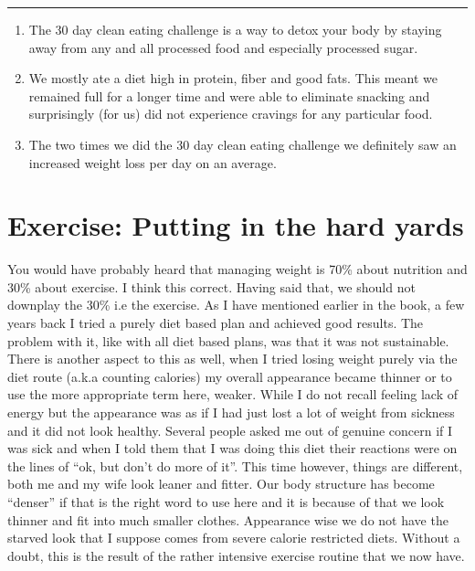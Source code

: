 \documentclass[
  oneside]{book}
\begin{document}
\begin{center}\rule{0.5\linewidth}{0.5pt}\end{center}

\begin{enumerate}
\def\labelenumi{\arabic{enumi}.}
\item
  The 30 day clean eating challenge is a way to detox your body by staying away from any and all processed food and especially processed sugar.
\item
  We mostly ate a diet high in protein, fiber and good fats. This meant we remained full for a longer time and were able to eliminate snacking and surprisingly (for us) did not experience cravings for any particular food.
\item
  The two times we did the 30 day clean eating challenge we definitely saw an increased weight loss per day on an average.
\end{enumerate}

\hypertarget{exercise-putting-in-the-hard-yards}{%
\chapter{Exercise: Putting in the hard yards}\label{exercise-putting-in-the-hard-yards}}

You would have probably heard that managing weight is 70\% about nutrition and 30\% about exercise. I think this correct. Having said that, we should not downplay the 30\% i.e the exercise. As I have mentioned earlier in the book, a few years back I tried a purely diet based plan and achieved good results. The problem with it, like with all diet based plans, was that it was not sustainable. There is another aspect to this as well, when I tried losing weight purely via the diet route (a.k.a counting calories) my overall appearance became thinner or to use the more appropriate term here, weaker. While I do not recall feeling lack of energy but the appearance was as if I had just lost a lot of weight from sickness and it did not look healthy. Several people asked me out of genuine concern if I was sick and when I told them that I was doing this diet their reactions were on the lines of ``ok, but don't do more of it''. This time however, things are different, both me and my wife look leaner and fitter. Our body structure has become ``denser'' if that is the right word to use here and it is because of that we look thinner and fit into much smaller clothes. Appearance wise we do not have the starved look that I suppose comes from severe calorie restricted diets. Without a doubt, this is the result of the rather intensive exercise routine that we now have.
\end{document}
